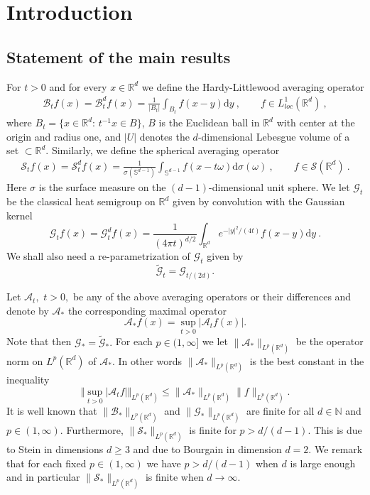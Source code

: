 \documentclass[a4paper, reqno]{amsart}
\theoremstyle{definition}
\newcommand{\R}{{\mathbb R}}
\newcommand{\N}{{\mathbb N}}
\newcommand{\dd}{{\mathrm d}}
\newcommand{\mG}{\mathcal{G}}
\newcommand{\tmG}{\tilde{\mathcal{G}}}
\newcommand{\mB}{\mathcal{B}}
\newcommand{\mS}{\mathcal{S}}
\newcommand{\mA}{\mathcal{A}}
\begin{document}
\maketitle

\section{Introduction}


\subsection{Statement of the main results} 
For $t>0$ and for every $x\in\mathbb{R}^d$ we define the Hardy-Littlewood  averaging operator
\begin{align*}
    \mB_tf(x)=\mB_t^df(x)= \frac{1}{|B_t|}\int_{B_t}f(x-y)\dd y~, \qquad f\in L^1_{loc}(\mathbb{R}^d)~,
\end{align*}
where $B_t=\lbrace x\in\mathbb{R}^d: \, t^{-1}x\in B\rbrace$, $B$ is the Euclidean ball in $\mathbb{R}^d$ with center at the origin and radius one, and $|U|$ denotes the $d$-dimensional Lebesgue volume of a set $\subset\mathbb{R}^d$.
Similarly, we define the spherical averaging operator
\begin{align*}
\mS_tf(x)=\mS^d_tf(x)= \frac{1}{\sigma(\mathbb{S}^{d-1})}\int_{\mathbb{S}^{d-1}}f(x-t\omega)\dd \sigma(\omega)~, \qquad f\in\mathcal{S}(\mathbb{R}^d)~.
\end{align*}
Here $\sigma$ is the surface measure on the $(d-1)$-dimensional unit sphere. We let $\mG_t$ be the classical heat semigroup on $\R^d$ given by convolution with the Gaussian kernel  
$$\mG_tf(x)= \mG_t^d f(x)=\frac{1}{(4\pi t)^{d/2}}\int_{\R^d}e^{-|y|^2/(4t)} f(x-y)\dd y~.$$ We shall also need a re-parametrization of $\mG_t$ given by
\[
\tmG_t=\mG_{t/(2d)}.
\]

Let $\mA_t,$ $t>0,$ be any of the above averaging operators or their differences and denote by $\mA_*$ the corresponding maximal operator
\[
\mA_* f(x)=\sup_{t>0}|\mA_t f(x)|.
\]
Note that then $\mG_*=\tmG_*.$ For each  $p\in (1,\infty]$ we let
$\|\mA_*\|_{L^p(\R^d)}$ be the operator norm on $L^p(\R^d)$ of $\mA_*$. In other words $\|\mA_*\|_{L^p(\R^d)}$ is the best constant in the inequality
\[
\Vert \sup_{t>0} |\mA_t f|\Vert_{L^p(\R^d)}\le \|\mA_*\|_{L^p(\R^d)}\|f\|_{L^p(\R^d)}.
\]
It is well known that $\|\mB_*\|_{L^p(\R^d)}$ and $\|\mG_*\|_{L^p(\R^d)}$ are finite for all $d\in \N$ and $p\in (1,\infty).$ Furthermore, $\|\mS_*\|_{L^p(\R^d)}$ is finite for $p> d/(d-1).$ This is due to Stein \cite{St_spher} in dimensions $d\ge 3$ and due to Bourgain \cite{Bo1} in dimension $d=2.$ We remark that for each fixed $p\in (1,\infty)$ we have $p>d/(d-1)$ when $d$ is large enough and in particular $\|\mS_*\|_{L^p(\R^d)}$ is finite when $d\to \infty.$
\end{document}
